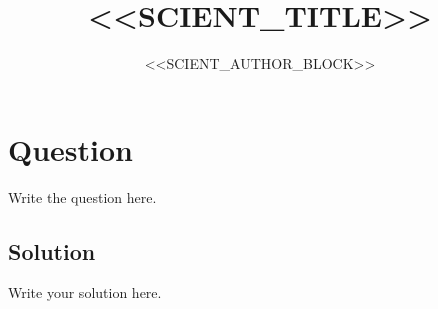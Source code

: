 \documentclass[11pt,a4paper]{article}
\title{<<SCIENT_TITLE>>}
\author{<<SCIENT_AUTHOR_BLOCK>>}
\date{}
\begin{document}
\maketitle

\section{Question}

Write the question here.

\subsection*{Solution}

Write your solution here.
\end{document}
